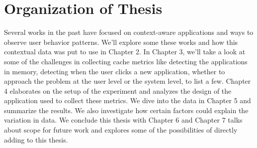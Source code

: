 \documentclass[12pt]{uthesis-v12}  %
\begin{document}
	\section{Organization of Thesis}
		Several works in the past have focused on context-aware applications and ways to observe user behavior patterns. We'll explore some these works and how this contextual data was put to use in Chapter 2. In Chapter 3, we'll take a look at some of the challenges in collecting cache metrics like detecting the applications in memory, detecting when the user clicks a new application, whether to approach the problem at the user level or the system level, to list a few. Chapter 4 elaborates on the setup of the experiment and analyzes the design of the application used to collect these metrics. We dive into the data in Chapter 5 and summarize the results. We also investigate how certain factors could explain the variation in data. 
		We conclude this thesis with Chapter 6 and Chapter 7 talks about scope for future work and explores some of the possibilities of directly adding to this thesis.  






\end{document}
